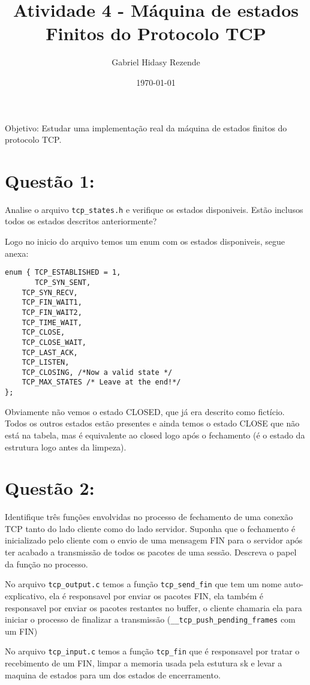\documentclass[11pt]{article}
\author{Gabriel Hidasy Rezende}
\date{\today}
\title{Atividade 4 - Máquina de estados Finitos do Protocolo TCP}
\begin{document}
\maketitle
Objetivo: Estudar uma implementação real da máquina de estados finitos do protocolo TCP.

\section{Questão 1:}
\label{sec-1}
Analise o arquivo \texttt{tcp\_states.h} e verifique os estados
disponiveis. Estão inclusos todos os estados descritos
anteriormente?

Logo no inicio do arquivo temos um enum com os estados
disponiveis, segue anexa:
\begin{verbatim}
enum { TCP_ESTABLISHED = 1, 
       TCP_SYN_SENT, 
	TCP_SYN_RECV,
	TCP_FIN_WAIT1, 
	TCP_FIN_WAIT2, 
	TCP_TIME_WAIT, 
	TCP_CLOSE,
	TCP_CLOSE_WAIT, 
	TCP_LAST_ACK,  
	TCP_LISTEN, 
	TCP_CLOSING, /*Now a valid state */ 
	TCP_MAX_STATES /* Leave at the end!*/ 
};
\end{verbatim}
Obviamente não vemos o estado CLOSED, que já era descrito como
fictício. Todos os outros estados estão presentes e ainda temos o
estado CLOSE que não está na tabela, mas é equivalente ao closed
logo após o fechamento (é o estado da estrutura logo antes da
limpeza).

\section{Questão 2:}
\label{sec-2}
Identifique três funções envolvidas no processo de fechamento de
uma conexão TCP tanto do lado cliente como do lado
servidor. Suponha que o fechamento é inicializado pelo cliente
com o envio de uma mensagem FIN para o servidor após ter acabado
a transmissão de todos os pacotes de uma sessão. Descreva o papel
da função no processo.

No arquivo \texttt{tcp\_output.c} temos a função \texttt{tcp\_send\_fin} que tem um
nome auto-explicativo, ela é responsavel por enviar os pacotes
FIN, ela também é responsavel por enviar os pacotes restantes no
buffer, o cliente chamaria ela para iniciar o processo de
finalizar a transmissão (\texttt{\_\_tcp\_push\_pending\_frames} com um FIN)

No arquivo \texttt{tcp\_input.c} temos a função \texttt{tcp\_fin} que é responsavel
por tratar o recebimento de um FIN, limpar a memoria usada pela
estutura sk e levar a maquina de estados para um dos estados de
encerramento.
\end{document}
